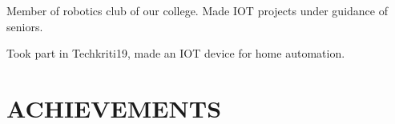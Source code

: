 \documentclass[]{deedy-resume-openfont}
\begin{document}
\begin{minipage}[t]{0.66\textwidth}
\begin{tightemize}
\item Member of robotics club of our college. Made IOT projects under guidance of seniors.
\item Took part in Techkriti19, made an IOT device for home automation.

\end{tightemize}
\sectionsep



\section{ACHIEVEMENTS} 

\textbullet{} 
\sectionsep

\end{minipage} 
\end{document}
